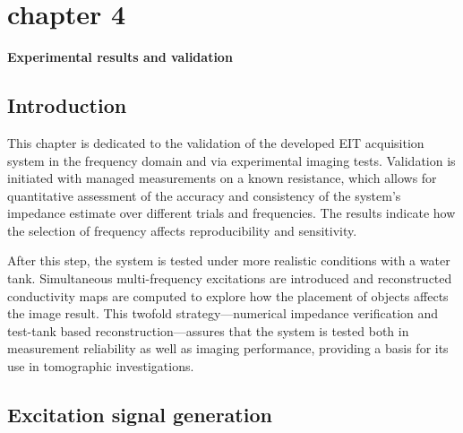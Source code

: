 \chapter*{chapter 4}

\textbf{\Huge Experimental results and validation
} 

\setcounter{chapter}{4}
\setcounter{section}{0}


\section{Introduction}
This chapter is dedicated to the validation of the developed EIT acquisition system in the frequency domain and via experimental imaging tests. Validation is initiated with managed measurements on a known resistance, which allows for quantitative assessment of the accuracy and consistency of the system's impedance estimate over different trials and frequencies. The results indicate how the selection of frequency affects reproducibility and sensitivity.

After this step, the system is tested under more realistic conditions with a water tank. Simultaneous multi-frequency excitations are introduced and reconstructed conductivity maps are computed to explore how the placement of objects affects the image result. This twofold strategy—numerical impedance verification and test-tank based reconstruction—assures that the system is tested both in measurement reliability as well as imaging performance, providing a basis for its use in tomographic investigations.
\section{Excitation signal generation}


